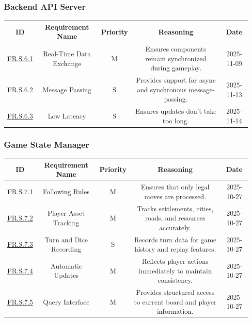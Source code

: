 \documentclass{article}
\begin{document}
\vspace{1em}

\subsubsection*{Backend API Server}

\begin{tabular}{|c|c|c|c|c|}
\hline
\textbf{ID} & \textbf{Requirement Name} & \textbf{Priority} &
\textbf{Reasoning} & \textbf{Date} \\
\hline
\hyperref[FR.S.6.1]{FR.S.6.1} & Real-Time Data Exchange & M &
\parbox[t]{4cm}{Ensures components remain synchronized during
gameplay.} &
2025-11-09 \\
\hline
\hyperref[FR.S.6.2]{FR.S.6.2} & Message Passing & S &
\parbox[t]{4cm}{Provides support for async and synchronous message-passing.} &
2025-11-13 \\
\hline
\hyperref[FR.S.6.3]{FR.S.6.3} & Low Latency & S &
\parbox[t]{4cm}{Ensures updates don't take too long.} &
2025-11-14 \\
\hline
\end{tabular}

\vspace{1em}

\subsubsection*{Game State Manager}

\begin{tabular}{|c|c|c|c|c|}
\hline
\textbf{ID} & \textbf{Requirement Name} & \textbf{Priority} &
\textbf{Reasoning} & \textbf{Date} \\
\hline
\hyperref[FR.S.7.1]{FR.S.7.1} & Following Rules & M &
\parbox[t]{4cm}{Ensures that only legal \emph{\Catan{}} moves are processed.} &
2025-10-27 \\
\hline
\hyperref[FR.S.7.2]{FR.S.7.2} & Player Asset Tracking & M &
\parbox[t]{4cm}{Tracks settlements, cities, roads, and resources
accurately.} &
2025-10-27 \\
\hline
\hyperref[FR.S.7.3]{FR.S.7.3} & Turn and Dice Recording & S &
\parbox[t]{4cm}{Records turn data for game history and replay
features.} &
2025-10-27 \\
\hline
\hyperref[FR.S.7.4]{FR.S.7.4} & Automatic Updates & M &
\parbox[t]{4cm}{Reflects player actions immediately to maintain
consistency.} &
2025-10-27 \\
\hline
\hyperref[FR.S.7.5]{FR.S.7.5} & Query Interface & M &
\parbox[t]{4cm}{Provides structured access to current board and
player information.} &
2025-10-27 \\
\hline
\end{tabular}
\end{document}
